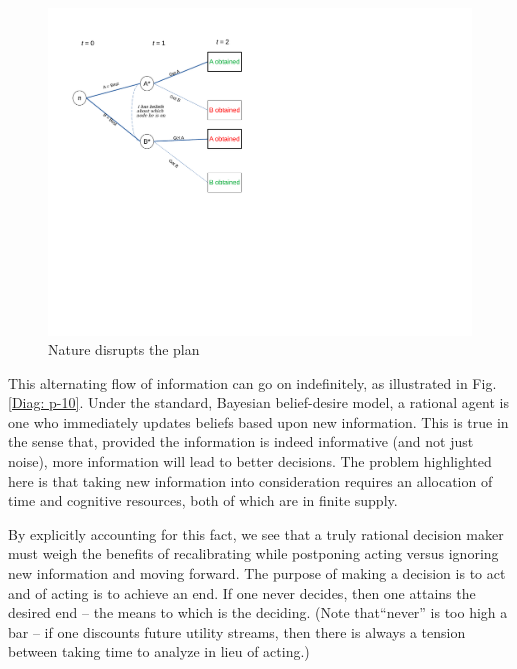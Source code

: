 \documentclass[
11pt,
titlepage,
reqno,
]{article}%
\theoremstyle{definition}
\begin{document}
\begin{figure}[h!]
	\centering
	\includegraphics*[page=9,trim = 0 3.5in 0in 0in,scale=.65]{Awareness_Diagrams_All}
	\caption{Nature disrupts the plan\label{Diag: p-09}}%
\end{figure}

This alternating flow of information can go on indefinitely, as illustrated in Fig. \ref{Diag: p-10}. Under the standard, Bayesian belief-desire model, a rational agent is one who immediately updates beliefs based upon new information. This is true in the sense that, provided the information is indeed informative (and not just noise), more information will lead to better decisions. The problem highlighted here is that taking new information into consideration requires an allocation of time and cognitive resources, both of which are in finite supply. 

By explicitly accounting for this fact, we see that a truly rational decision maker must weigh the benefits of recalibrating while postponing acting versus ignoring new information and moving forward. The purpose of making a decision is to act and of acting is to achieve an end. If one never decides, then one attains the desired end -- the means to which is the deciding. (Note that``never'' is too high a bar -- if one discounts future utility streams, then there is always a tension between taking time to analyze in lieu of acting.)
\end{document}
